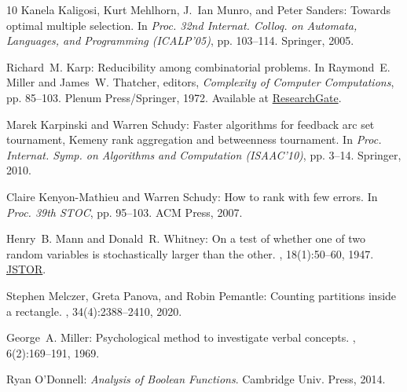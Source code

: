 \begin{thebibliography}{10}
{\sc Kanela Kaligosi, Kurt Mehlhorn, J.~Ian Munro, and Peter Sanders}: Towards
  optimal multiple selection.
\newblock In {\em Proc. 32nd Internat. Colloq. on Automata, Languages, and
  Programming (ICALP'05)}, pp. 103--114. Springer, 2005.
\newblock [\epfmtdoi{10.1007/11523468\_9}]

{\sc Richard~M. Karp}: Reducibility among combinatorial problems.
\newblock In {\sc Raymond~E. Miller and James~W. Thatcher}, editors, {\em
  Complexity of Computer Computations}, pp. 85--103. Plenum Press/Springer,
  1972.
\newblock Available at
  \href{https://www.researchgate.net/publication/221580898_Reducibility_Among_Combinatorial_Problems}{ResearchGate}.
\newblock [\epfmtdoi{10.1007/978-1-4684-2001-2\_9}]

{\sc Marek Karpinski and Warren Schudy}: Faster algorithms for feedback arc set
  tournament, {K}emeny rank aggregation and betweenness tournament.
\newblock In {\em Proc. Internat. Symp. on Algorithms and Computation
  (ISAAC'10)}, pp. 3--14. Springer, 2010.
\newblock [\epfmtdoi{10.1007/978-3-642-17517-6\_3}]

{\sc Claire Kenyon-Mathieu and Warren Schudy}: How to rank with few errors.
\newblock In {\em Proc. 39th STOC}, pp. 95--103. ACM Press, 2007.
\newblock [\epfmtdoi{10.1145/1250790.1250806}]

{\sc Henry~B. Mann and Donald~R. Whitney}: On a test of whether one of two
  random variables is stochastically larger than the other.
, 18(1):50--60, 1947.
\newblock \href{https://www.jstor.org/stable/2236101}{JSTOR}.

{\sc Stephen Melczer, Greta Panova, and Robin Pemantle}: Counting partitions
  inside a rectangle.
, 34(4):2388--2410, 2020.
\newblock [\epfmtdoi{10.1137/20M1315828}]

{\sc George~A. Miller}: Psychological method to investigate verbal concepts.
, 6(2):169--191, 1969.
\newblock [\epfmtdoi{10.1016/0022-2496(69)90001-7}]

{\sc Ryan O'Donnell}: {\em Analysis of Boolean Functions}.
\newblock Cambridge Univ. Press, 2014.


\end{thebibliography}
